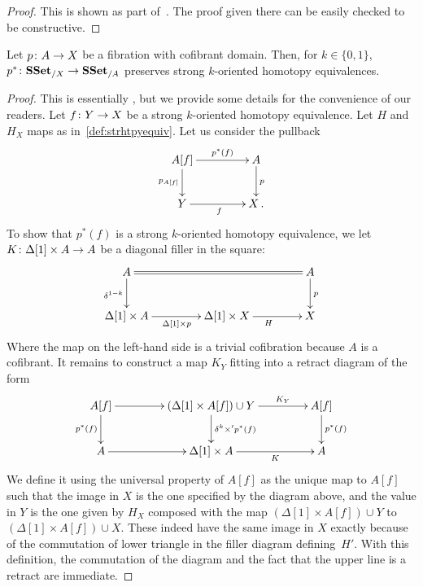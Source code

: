 \documentclass[reqno,10pt,a4paper,oneside,draft]{amsart}
\begin{document}
\begin{proof}
This is shown as part of~\cite[Theorem 3.2.3]{joyal-tierney:simplicial-homotopy-theory}. The proof given there can be easily checked to be constructive. 
\end{proof}




\begin{lemma} 
\label{lemma:pb_of_StrongHomotopyEq}
Let $p \colon A \rightarrow X$ be a fibration with cofibrant domain. Then, for $k \in \{0,1\}$, 
$p^* \colon \mathbf{SSet}_{/X} \to \mathbf{SSet}_{/A}$ preserves strong $k$-oriented homotopy equivalences.
\end{lemma}



\begin{proof} This is essentially \cite[Lemma~3.7]{gambino2017frobenius}, but we provide some details
for the convenience of our readers.
Let $f \colon Y \rightarrow X$ be a strong $k$-oriented homotopy equivalence. Let $H$ and $H_X$  maps 
as in~\cref{def:strhtpyequiv}. Let us consider the pullback
\[
\xymatrix@C=1.5cm{
A[f] \ar[r]^-{p^*(f)}  \ar[d]_{p_{A[f]}} & A \ar[d]^{p} \\
Y \ar[r]_{f} & X \, .\\
}
\] 
To show that $p^*(f)$ is a strong $k$-oriented homotopy equivalence, we let $K \colon \Delta[1] \times A \rightarrow A$ be a diagonal filler in the square:
\[
\xymatrix@C=1.5cm{
A \ar[d]_{\delta^{1-k}} \ar@{=}[rr] & & A \ar[d]^p \\ 
\Delta[1] \times A \ar[r]_{\Delta[1] \times p}  & \Delta[1] \times X \ar[r]_H & X
}\]
Where the map on the left-hand side is a trivial cofibration because $A$ is a cofibrant.
It remains to construct a map $K_Y$  fitting into a retract diagram of the form
\[
\xymatrix@C=1.5cm{
A[f]  \ar[d]_{p^*(f)} \ar[r] &  (\Delta[1] \times A[f])  \cup Y \ar[d]^{\delta^k \times' p^*(f)} \ar[r]^-{K_Y} & A[f] \ar[d]^{p^*(f)} \\
A \ar[r] & \Delta[1]  \times A \ar[r]_-{K} & A
}
\]
We define it using the universal property of $A[f]$ as the unique map to $A[f]$ such that the image in $X$ is the one specified by the diagram above, and the value in $Y$ is the one given by $H_X$ composed with the map $(\Delta[1] \times A[f]) \cup Y$ to $(\Delta[1] \times A[f]) \cup X$. These indeed have the same image in $X$ exactly because of the commutation of lower triangle in the filler diagram defining~$H'$. With this definition, the commutation of the diagram and the fact that the upper line is a retract are immediate.
\end{proof}
\end{document}
